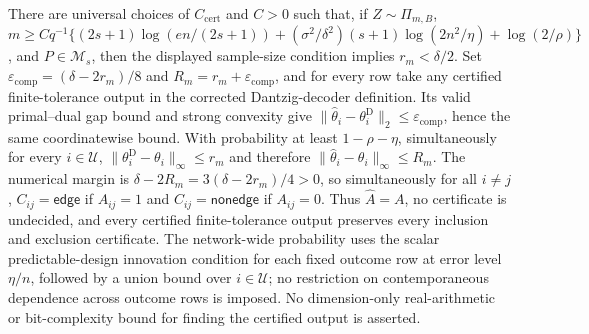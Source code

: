 There are universal choices of \(C_{\mathrm{cert}}\) and \(C>0\) such that, if \(Z\sim\Pi_{m,B}\), \(m\ge Cq^{-1}\{(2s+1)\log(en/(2s+1))+(\sigma^2/\delta^2)(s+1)\log(2n^2/\eta)+\log(2/\rho)\}\), and \(P\in\mathcal M_s\), then the displayed sample-size condition implies \(r_m<\delta/2\). Set \(\varepsilon_{\mathrm{comp}}=(\delta-2r_m)/8\) and \(R_m=r_m+\varepsilon_{\mathrm{comp}}\), and for every row take any certified finite-tolerance output in the corrected Dantzig-decoder definition. Its valid primal--dual gap bound and strong convexity give \(\lVert\widehat\theta_i-\theta_i^{\mathrm D}\rVert_2\le\varepsilon_{\mathrm{comp}}\), hence the same coordinatewise bound. With probability at least \(1-\rho-\eta\), simultaneously for every \(i\in\mathcal U\), \(\lVert\theta_i^{\mathrm D}-\theta_i\rVert_\infty\le r_m\) and therefore \(\lVert\widehat\theta_i-\theta_i\rVert_\infty\le R_m\). The numerical margin is \(\delta-2R_m=3(\delta-2r_m)/4>0\), so simultaneously for all \(i\ne j\), \(C_{ij}=\mathsf{edge}\) if \(A_{ij}=1\) and \(C_{ij}=\mathsf{nonedge}\) if \(A_{ij}=0\). Thus \(\widehat A=A\), no certificate is undecided, and every certified finite-tolerance output preserves every inclusion and exclusion certificate. The network-wide probability uses the scalar predictable-design innovation condition for each fixed outcome row at error level \(\eta/n\), followed by a union bound over \(i\in\mathcal U\); no restriction on contemporaneous dependence across outcome rows is imposed. No dimension-only real-arithmetic or bit-complexity bound for finding the certified output is asserted.